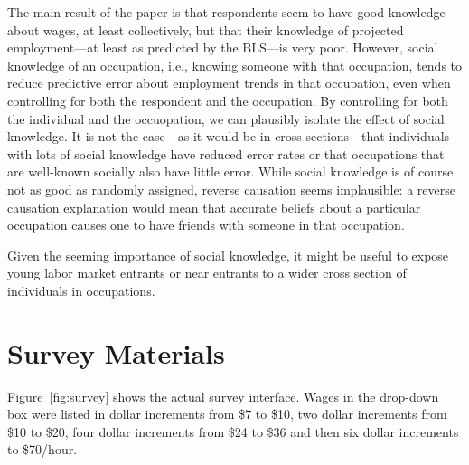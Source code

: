 \documentclass[12pt]{article}
\begin{document}
The main result of the paper is that respondents seem to have good knowledge about wages, at least collectively, but that their knowledge of projected employment---at least as predicted by the BLS---is very poor.
However, social knowledge of an occupation, i.e., knowing someone with that occupation, tends to reduce predictive error about employment trends in that occupation, even when controlling for both the respondent and the occupation. 
By controlling for both the individual and the occuopation, we can plausibly isolate the effect of social knowledge. 
It is not the case---as it would be in cross-sections---that individuals with lots of social knowledge have reduced error rates or that occupations that are well-known socially also have little error. 
While social knowledge is of course not as good as randomly assigned, reverse causation seems implausible: 
a reverse causation explanation would mean that accurate beliefs about a particular occupation causes one to have friends with someone in that occupation. 

Given the seeming importance of social knowledge, it might be useful to expose young labor market entrants or near entrants to a wider cross section of individuals in occupations.
 



\newpage 

\appendix 

\section{Survey Materials} \label{sec:survey}  
Figure~\ref{fig:survey} shows the actual survey interface.  
Wages in the drop-down box were listed in dollar increments from \$7 to \$10, two dollar increments from \$10 to \$20, four dollar increments from \$24 to \$36 and then six dollar increments to \$70/hour.  
\end{document}
